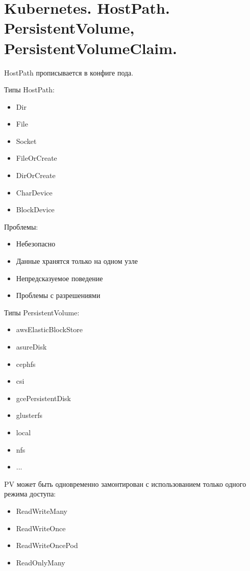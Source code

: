\section{Kubernetes. HostPath. PersistentVolume, PersistentVolumeClaim.}

HostPath прописывается в конфиге пода.

Типы HostPath:
\begin{itemize}
    \item Dir
    \item File
    \item Socket
    \item FileOrCreate
    \item DirOrCreate
    \item CharDevice
    \item BlockDevice
\end{itemize}

Проблемы:
\begin{itemize}
    \item Небезопасно
    \item Данные хранятся только на одном узле
    \item Непредсказуемое поведение
    \item Проблемы с разрешениями
\end{itemize}


Типы PersistentVolume:
\begin{itemize}
    \item awsElasticBlockStore
    \item asureDisk
    \item cephfs
    \item csi
    \item gcePersistentDisk
    \item glusterfs
    \item local
    \item nfs
    \item ...
\end{itemize}

PV может быть одновременно замонтирован с использованием только одного
режима доступа:
\begin{itemize}
    \item ReadWriteMany
    \item ReadWriteOnce
    \item ReadWriteOncePod
    \item ReadOnlyMany
\end{itemize}
